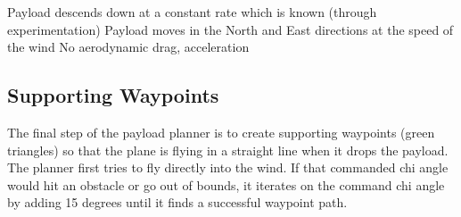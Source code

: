 \documentclass[]{auvsi_doc}
\begin{document}
    Payload descends down at a constant rate which is known (through experimentation)
    Payload moves in the North and East directions at the speed of the wind
    No aerodynamic drag, acceleration

\subsection{Supporting Waypoints}

The final step of the payload planner is to create supporting waypoints (green triangles) so that the plane is flying in a straight line when it drops the payload.
The planner first tries to fly directly into the wind. If that commanded chi angle would hit an obstacle or go out of bounds, it iterates on the command chi angle by adding 15 degrees until it finds a successful waypoint path.
\end{document}
